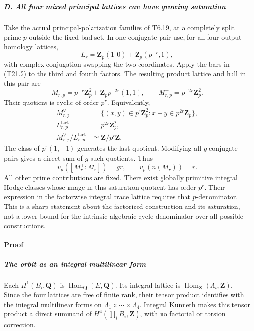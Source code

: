 \subparagraph{D. All four mixed principal lattices can have growing saturation}\label{d.-all-four-mixed-principal-lattices-can-have-growing-saturation}

Take the actual principal-polarization families of T6.19, at a completely split prime \(p\) outside the fixed bad set. In one conjugate pair use, for all four output homology lattices, \[
 L_r=\mathbf Z_p(1,0)+\mathbf Z_p(p^{-r},1),
\] with complex conjugation swapping the two coordinates. Apply the bars in (T21.2) to the third and fourth factors. The resulting product lattice and hull in this pair are \[
 M_{r,p}
   =p^{-r}\mathbf Z_p^2+
           \mathbf Z_p p^{-2r}(1,1),
 \qquad
 M_{r,p}^+=p^{-2r}\mathbf Z_p^2.
 \tag{T21.10}
\] Their quotient is cyclic of order \(p^r\). Equivalently, \[
 \begin{aligned}
 M_{r,p}^\vee
  &=\{(x,y)\in p^r\mathbf Z_p^2:x+y\in p^{2r}\mathbf Z_p\},\\
 L_{r,p}^{\mathrm{fact}}&=p^{2r}\mathbf Z_p^2,\\
 M_{r,p}^\vee/L_{r,p}^{\mathrm{fact}}&\simeq\mathbf Z/p^r\mathbf Z.
 \end{aligned}
 \tag{T21.11}
\] The class of \(p^r(1,-1)\) generates the last quotient. Modifying all \(g\) conjugate pairs gives a direct sum of \(g\) such quotients. Thus \[
 v_p([M_r^+:M_r])=gr,
 \qquad v_p(n(M_r))=r.
 \tag{T21.12}
\] All other prime contributions are fixed. There exist globally primitive integral Hodge classes whose image in this saturation quotient has order \(p^r\). Their expression in the factorwise integral trace lattice requires that \(p\)-denominator. This is a sharp statement about the factorized construction and its saturation, not a lower bound for the intrinsic algebraic-cycle denominator over all possible constructions.

\paragraph{Proof}\label{proof-2}

\subparagraph{The orbit as an integral multilinear form}\label{the-orbit-as-an-integral-multilinear-form}

Each \(H^1(B_i,\mathbf Q)\) is \(\operatorname{Hom}_{\mathbf Q}(E,\mathbf Q)\). Its integral lattice is \(\operatorname{Hom}_{\mathbf Z}(\Lambda_i,\mathbf Z)\). Since the four lattices are free of finite rank, their tensor product identifies with the integral multilinear forms on \(\Lambda_1\times\cdots\times\Lambda_4\). Integral Kunneth makes this tensor product a direct summand of \(H^4(\prod_i B_i,\mathbf Z)\), with no factorial or torsion correction.


